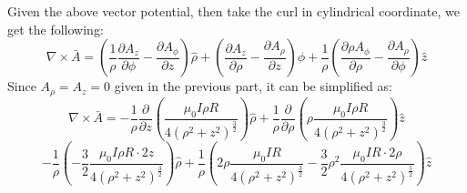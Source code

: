 \documentclass{article}
\begin{document}
Given the above vector potential, then take the curl in cylindrical coordinate, we get the following:
$$\nabla\times \bar{A}=\left(\frac{1}{\rho}\frac{\partial A_z}{\partial \phi}-\frac{\partial A_\phi}{\partial z}\right)\hat{\rho}+\left(\frac{\partial A_z}{\partial \rho}-\frac{\partial A_\rho}{\partial z}\right)\hat{\phi}+\frac{1}{\rho}\left(\frac{\partial \rho A_\phi}{\partial \rho}-\frac{\partial A_\rho}{\partial \phi}\right)\hat{z}$$
Since $A_\rho=A_z=0$ given in the previous part, it can be simplified as:
$$\nabla\times \bar{A}=-\frac{1}{\rho}\frac{\partial}{\partial z}\left(\frac{\mu_0I\rho R}{4(\rho^2+z^2)^\frac{3}{2}}\right)\hat{\rho}+\frac{1}{\rho}\frac{\partial}{\partial \rho}\left(\rho \frac{\mu_0I\rho R}{4(\rho^2+z^2)^\frac{3}{2}}\right)\hat{z}$$
$$-\frac{1}{\rho}\left(-\frac{3}{2}\frac{\mu_0I\rho R\cdot 2z}{4(\rho^2+z^2)^\frac{3}{2}}\right)\hat{\rho}+\frac{1}{\rho}\left(2\rho\frac{\mu_0IR}{4(\rho^2+z^2)^\frac{3}{2}}-\frac{3}{2}\rho^2\frac{\mu_0IR\cdot 2\rho}{4(\rho^2+z^2)^\frac{5}{2}}\right)\hat{z}$$
\end{document}
